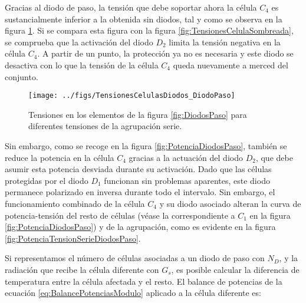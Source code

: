 Gracias al diodo de paso, la tensión que debe soportar ahora la célula
$C_{4}$ es sustancialmente inferior a la obtenida sin diodos, tal
y como se observa en la figura \ref{fig:TensionesDiodosPaso}. Si
se compara esta figura con la figura \ref{fig:TensionesCelulaSombreada},
se comprueba que la activación del diodo $D_{2}$ limita la tensión
negativa en la célula $C_{4}$. A partir de un punto, la protección
ya no es necesaria y este diodo se desactiva con lo que la tensión
de la célula $C_{4}$ queda nuevamente a merced del conjunto. 


\begin{figure}
\begin{centering}
\texttt{[image: ../figs/TensionesCelulasDiodos\_DiodoPaso]}
\end{centering}

\caption{Tensiones en los elementos de la figura \ref{fig:DiodosPaso} para
diferentes tensiones de la agrupación serie.\label{fig:TensionesDiodosPaso}}

\end{figure}

Sin embargo, como se recoge en la figura \ref{fig:PotenciaDiodosPaso},
también se reduce la potencia en la célula $C_{4}$ gracias a la actuación
del diodo $D_{2}$, que debe asumir esta potencia desviada durante
su activación. Dado que las células protegidas por el diodo $D_{1}$
funcionan sin problemas aparentes, este diodo permanece polarizado
en inversa durante todo el intervalo. Sin embargo, el funcionamiento
combinado de la célula $C_{4}$ y su diodo asociado alteran la curva
de potencia-tensión del resto de células (véase la correspondiente
a $C_{1}$ en la figura \ref{fig:PotenciaDiodosPaso}) y de la agrupación,
como es evidente en la figura \ref{fig:PotenciaTensionSerieDiodosPaso}. 

Si representamos el número de células asociadas a un diodo de paso
con $N_{D}$,
y la radiación que recibe la célula diferente con $G_{s}$, es posible
calcular la diferencia de temperatura entre la célula afectada y el
resto. El balance de potencias de la ecuación \ref{eq:BalancePotenciasModulo}
aplicado a la célula diferente es:

